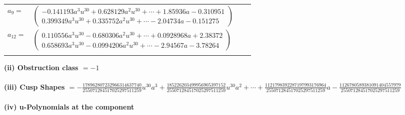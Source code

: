 \documentclass[1p]{elsarticle_modified}
\theoremstyle{definition}
\begin{document}
\begin{tabular}{m{7pt} m{180pt} m{7pt} m{180pt} }
\flushright $a_{9}=$&$\begin{pmatrix}-0.141193 a^{3} u^{30}+0.628129 a^{2} u^{30}+\cdots+1.85936 a-0.310951\\0.399349 a^{3} u^{30}+0.335752 a^{2} u^{30}+\cdots-2.04734 a-0.151275\end{pmatrix}$ \\
\flushright $a_{12}=$&$\begin{pmatrix}0.110556 a^{3} u^{30}-0.680306 a^{2} u^{30}+\cdots+0.0928968 a+2.38372\\0.658693 a^{3} u^{30}-0.0994206 a^{2} u^{30}+\cdots-2.94567 a-3.78264\end{pmatrix}$\\&\end{tabular}
\flushleft \textbf{(ii) Obstruction class $= -1$}\\~\\
\flushleft \textbf{(iii) Cusp Shapes $= -\frac{178962807232966314637740}{255071284517025297511259} u^{30} a^3+\frac{185226203499956905397152}{255071284517025297511259} u^{30} a^2+\cdots+\frac{1121798392287197993176964}{255071284517025297511259} a-\frac{1126780589381091404557979}{255071284517025297511259}$}\\~\\
\newpage\renewcommand{\arraystretch}{1}
\flushleft \textbf{(iv) u-Polynomials at the component}\newline \\
\end{document}
